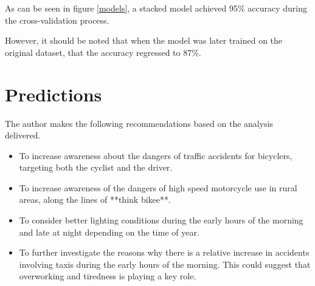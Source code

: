 \documentclass[12pt]{article}
\begin{document}
As can be seen in figure \ref{models}, a stacked model achieved 95\% accuracy during the cross-validation process. 

However, it should be noted that when the model was later trained on the original dataset, that the accuracy regressed to 87\%.

\section{Predictions}

The author makes the following recommendations based on the analysis delivered.
\begin{itemize}
\item To increase awareness about the dangers of traffic accidents for bicyclers, targeting both the cyclist and the driver.
\item To increase awareness of the dangers of high speed motorcycle use in rural areas, along the lines of **think bikee**. 
\item To consider better lighting conditions during the early hours of the morning and late at night depending on the time of year.
\item To further investigate the reasons why there is a relative increase in accidents involving taxis during the early hours of the morning. This could suggest that overworking and tiredness is playing a key role.
\end{itemize}

\printbibliography
\end{document}
